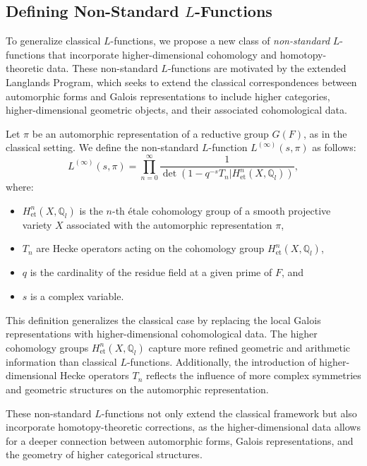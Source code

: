 \documentclass{article}
\theoremstyle{remark}
\begin{document}
\subsection{Defining Non-Standard $L$-Functions}

To generalize classical $L$-functions, we propose a new class of \emph{non-standard} $L$-functions that incorporate higher-dimensional cohomology and homotopy-theoretic data. These non-standard $L$-functions are motivated by the extended Langlands Program, which seeks to extend the classical correspondences between automorphic forms and Galois representations to include higher categories, higher-dimensional geometric objects, and their associated cohomological data.

Let $\pi$ be an automorphic representation of a reductive group $G(F)$, as in the classical setting. We define the non-standard $L$-function $L^{(\infty)}(s, \pi)$ as follows:
\[
L^{(\infty)}(s, \pi) = \prod_{n=0}^{\infty} \frac{1}{\det(1 - q^{-s} T_n | H^n_{\text{et}}(X, \mathbb{Q}_l))},
\]
where:
\begin{itemize}
    \item $H^n_{\text{et}}(X, \mathbb{Q}_l)$ is the $n$-th étale cohomology group of a smooth projective variety $X$ associated with the automorphic representation $\pi$,
    \item $T_n$ are Hecke operators acting on the cohomology group $H^n_{\text{et}}(X, \mathbb{Q}_l)$,
    \item $q$ is the cardinality of the residue field at a given prime of $F$, and
    \item $s$ is a complex variable.
\end{itemize}

This definition generalizes the classical case by replacing the local Galois representations with higher-dimensional cohomological data. The higher cohomology groups $H^n_{\text{et}}(X, \mathbb{Q}_l)$ capture more refined geometric and arithmetic information than classical $L$-functions. Additionally, the introduction of higher-dimensional Hecke operators $T_n$ reflects the influence of more complex symmetries and geometric structures on the automorphic representation.

These non-standard $L$-functions not only extend the classical framework but also incorporate homotopy-theoretic corrections, as the higher-dimensional data allows for a deeper connection between automorphic forms, Galois representations, and the geometry of higher categorical structures.
\end{document}
